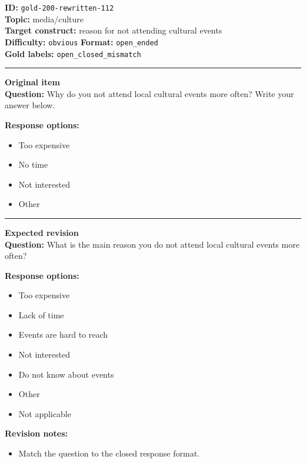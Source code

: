 \documentclass[10pt,a4paper]{article}
\newcommand{\sectionline}{\vspace{0.15em}\hrule\vspace{0.35em}}
\begin{document}
\begin{tcolorbox}[colframe=FlawRed,colback=white,colbacktitle=FlawRed!9,coltitle=black,title={Item 112\hfill Flawed item}]
\textbf{ID:} \texttt{gold-200-rewritten-112}\\
\textbf{Topic:} media/culture\\
\textbf{Target construct:} reason for not attending cultural events\\
\textbf{Difficulty:} \texttt{obvious} \quad \textbf{Format:} \texttt{open\_ended}\\
\textbf{Gold labels:} \texttt{open\_closed\_mismatch}\\
\sectionline
\textbf{Original item}\\
\textbf{Question:} Why do you not attend local cultural events more often? Write your answer below.
\par\textbf{Response options:}
\begin{itemize}
\item Too expensive
\item No time
\item Not interested
\item Other
\end{itemize}
\sectionline
\textbf{Expected revision}\\
\textbf{Question:} What is the main reason you do not attend local cultural events more often?
\par\textbf{Response options:}
\begin{itemize}
\item Too expensive
\item Lack of time
\item Events are hard to reach
\item Not interested
\item Do not know about events
\item Other
\item Not applicable
\end{itemize}
\par\textbf{Revision notes:}
\begin{itemize}
\item Match the question to the closed response format.
\end{itemize}
\end{tcolorbox}
\end{document}
